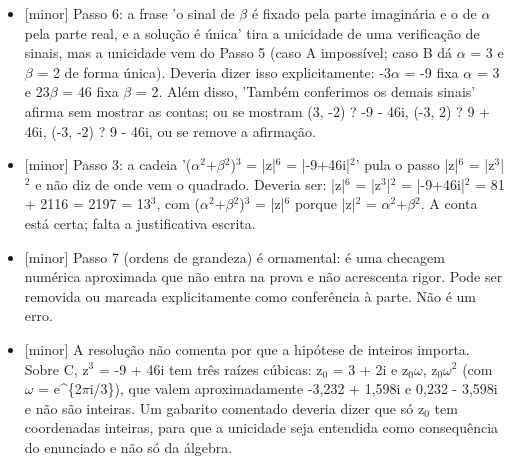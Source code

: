 \documentclass{article}%
\begin{document}
\begin{itemize}%
\item%
{[}minor{]} Passo 6: a frase 'o sinal de $\beta$ é fixado pela parte imaginária e o de $\alpha$ pela parte real, e a solução é única' tira a unicidade de uma verificação de sinais, mas a unicidade vem do Passo 5 (caso A impossível; caso B dá $\alpha$ = 3 e $\beta$ = 2 de forma única). Deveria dizer isso explicitamente: -3$\alpha$ = -9 fixa $\alpha$ = 3 e 23$\beta$ = 46 fixa $\beta$ = 2. Além disso, 'Também conferimos os demais sinais' afirma sem mostrar as contas; ou se mostram (3, -2) ? -9 - 46i, (-3, 2) ? 9 + 46i, (-3, -2) ? 9 - 46i, ou se remove a afirmação.%
\item%
{[}minor{]} Passo 3: a cadeia '($\alpha$$^2$+$\beta$$^2$)$^3$ = |z|$^{6}$ = |-9+46i|$^2$' pula o passo |z|$^{6}$ = |z$^3$|$^2$ e não diz de onde vem o quadrado. Deveria ser: |z|$^{6}$ = |z$^3$|$^2$ = |-9+46i|$^2$ = 81 + 2116 = 2197 = 13$^3$, com ($\alpha$$^2$+$\beta$$^2$)$^3$ = |z|$^{6}$ porque |z|$^2$ = $\alpha$$^2$+$\beta$$^2$. A conta está certa; falta a justificativa escrita.%
\item%
{[}minor{]} Passo 7 (ordens de grandeza) é ornamental: é uma checagem numérica aproximada que não entra na prova e não acrescenta rigor. Pode ser removida ou marcada explicitamente como conferência à parte. Não é um erro.%
\item%
{[}minor{]} A resolução não comenta por que a hipótese de inteiros importa. Sobre C, z$^3$ = -9 + 46i tem três raízes cúbicas: z$_{0}$ = 3 + 2i e z$_{0}$$\omega$, z$_{0}$$\omega$$^2$ (com $\omega$ = e\^{}\{2$\pi$i/3\}), que valem aproximadamente -3,232 + 1,598i e 0,232 - 3,598i e não são inteiras. Um gabarito comentado deveria dizer que só z$_{0}$ tem coordenadas inteiras, para que a unicidade seja entendida como consequência do enunciado e não só da álgebra.%
\end{itemize}%
\end{document}
